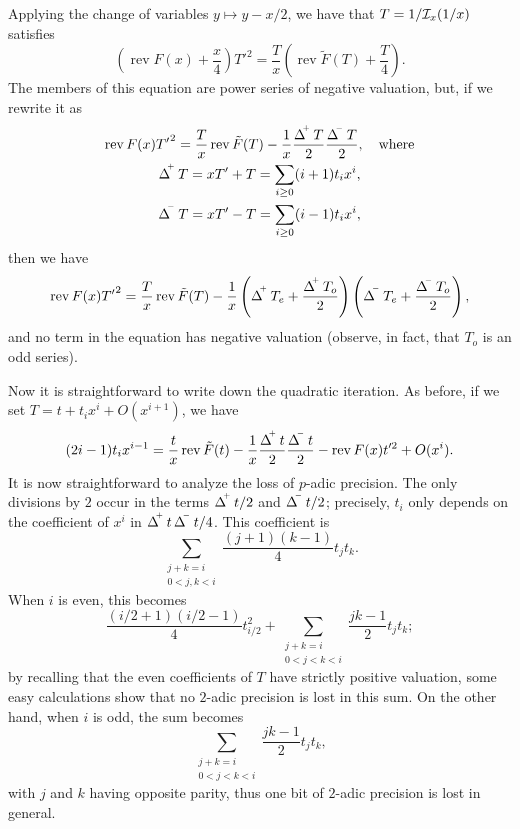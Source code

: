 \documentclass{article}
\DeclareMathOperator{\rev}{rev}
\DeclareMathOperator{\Dplus}{\Delta^{{}^{\kern-0.5ex +}}}
\DeclareMathOperator{\Dminus}{\Delta^{{}^{\kern-0.5ex -}}}
\begin{document}
Applying the change of variables $y\mapsto y-x/2$, we have that
$T=1/\mathcal{I}_x(1/x)$ satisfies
\begin{equation}
  \label{eq:31}
  \left(\rev F(x) + \frac{x}{4}\right){T'}^2 = \frac{T}{x}\left(\rev\tilde{F}(T) + \frac{T}{4}\right).
\end{equation}
The members of this equation are power series of negative valuation,
but, if we rewrite it as
\begin{equation}
  \label{eq:32}
  \begin{gathered}
    \rev F(x){T'}^2 = \frac{T}{x}\rev\tilde{F}(T) - \frac{1}{x}\frac{\Dplus T}{2}\frac{\Dminus T}{2},
    \quad\text{where}\\
    \Dplus T = xT' + T = \sum_{i\ge0}(i+1)t_ix^i,\\
    \Dminus T = xT' - T = \sum_{i\ge0}(i-1)t_ix^i,
  \end{gathered}
\end{equation}
then we have
\begin{equation}
  \label{eq:37}
    \rev F(x){T'}^2 = \frac{T}{x}\rev\tilde{F}(T) -
    \frac{1}{x}\left(\Dplus T_e + \frac{\Dplus T_o}{2}\right)\left(\Dminus T_e + \frac{\Dminus T_o}{2}\right),
\end{equation}
and no term in the equation has negative valuation (observe, in fact,
that $T_o$ is an odd series).

Now it is straightforward to write down the quadratic iteration. As
before, if we set $T=t+t_ix^i+O(x^{i+1})$, we have
\begin{equation}
  \label{eq:38}
  (2i-1)t_ix^{i-1} = 
  \frac{t}{x}\rev\tilde{F}(t) - \frac{1}{x}\frac{\Dplus t}{2}\frac{\Dminus t}{2}
  - \rev F(x)t'^2 + O(x^i).
\end{equation}
It is now straightforward to analyze the loss of $p$-adic
precision. The only divisions by $2$ occur in the terms $\Dplus t/2$
and $\Dminus t/2$; precisely, $t_i$ only depends on the coefficient of
$x^i$ in $\Dplus t\Dminus t/4$. This coefficient is
\begin{equation}
  \sum_{\substack{j+k=i\\0<j,k<i}}\frac{(j+1)(k-1)}{4}t_jt_k.
\end{equation}
When $i$ is even, this becomes
\begin{equation}
  \frac{(i/2+1)(i/2-1)}{4}t_{i/2}^2 + \sum_{\substack{j+k=i\\0<j<k<i}}\frac{jk-1}{2}t_jt_k;
\end{equation}
by recalling that the even coefficients of $T$ have strictly positive
valuation, some easy calculations show that no $2$-adic precision is
lost in this sum. On the other hand, when $i$ is odd, the sum becomes
\begin{equation}
  \sum_{\substack{j+k=i\\0<j<k<i}}\frac{jk-1}{2}t_jt_k,
\end{equation}
with $j$ and $k$ having opposite parity, thus one bit of $2$-adic
precision is lost in general.
\end{document}
